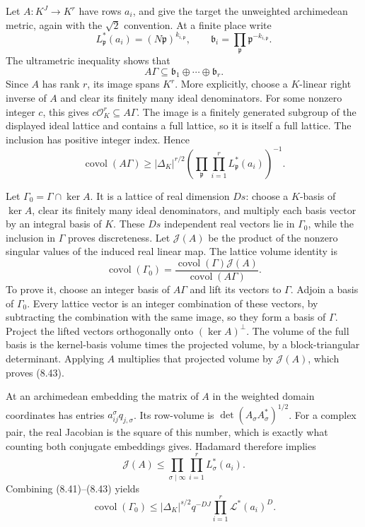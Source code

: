 \documentclass[
  11pt,
  a4paper,
]{article}
\begin{document}
Let \(A:K^J\to K^r\) have rows \(a_i\), and give the target the
unweighted archimedean metric, again with the \(\sqrt2\) convention. At
a finite place write \[
L_{\mathfrak p}^*(a_i)=(N\mathfrak p)^{k_{i,\mathfrak p}},
\qquad
\mathfrak b_i=\prod_{\mathfrak p}\mathfrak p^{-k_{i,\mathfrak p}}.
\] The ultrametric inequality shows that \[
A\Gamma\subseteq\mathfrak b_1\oplus\cdots\oplus\mathfrak b_r.
\] Since \(A\) has rank \(r\), its image spans \(K^r\). More explicitly,
choose a \(K\)-linear right inverse of \(A\) and clear its finitely many
ideal denominators. For some nonzero integer \(c\), this gives
\(c\mathcal O_K^r\subseteq A\Gamma\). The image is a finitely generated
subgroup of the displayed ideal lattice and contains a full lattice, so
it is itself a full lattice. The inclusion has positive integer index.
Hence \[
\operatorname{covol}(A\Gamma)\ge
|\Delta_K|^{r/2}
\left(\prod_{\mathfrak p}\prod_{i=1}^r
L_{\mathfrak p}^*(a_i)\right)^{-1}.
\tag{8.42}
\]

Let \(\Gamma_0=\Gamma\cap\ker A\). It is a lattice of real dimension
\(Ds\): choose a \(K\)-basis of \(\ker A\), clear its finitely many
ideal denominators, and multiply each basis vector by an integral basis
of \(K\). These \(Ds\) independent real vectors lie in \(\Gamma_0\),
while the inclusion in \(\Gamma\) proves discreteness. Let
\(\mathcal J(A)\) be the product of the nonzero singular values of the
induced real linear map. The lattice volume identity is \[
\operatorname{covol}(\Gamma_0)=
\frac{\operatorname{covol}(\Gamma)\mathcal J(A)}
{\operatorname{covol}(A\Gamma)}.
\tag{8.43}
\] To prove it, choose an integer basis of \(A\Gamma\) and lift its
vectors to \(\Gamma\). Adjoin a basis of \(\Gamma_0\). Every lattice
vector is an integer combination of these vectors, by subtracting the
combination with the same image, so they form a basis of \(\Gamma\).
Project the lifted vectors orthogonally onto \((\ker A)^\perp\). The
volume of the full basis is the kernel-basis volume times the projected
volume, by a block-triangular determinant. Applying \(A\) multiplies
that projected volume by \(\mathcal J(A)\), which proves (8.43).

At an archimedean embedding the matrix of \(A\) in the weighted domain
coordinates has entries \(a_{ij}^\sigma q_{j,\sigma}\). Its row-volume
is \(\det(A_\sigma A_\sigma^*)^{1/2}\). For a complex pair, the real
Jacobian is the square of this number, which is exactly what counting
both conjugate embeddings gives. Hadamard therefore implies \[
\mathcal J(A)\le
\prod_{\sigma\mid\infty}\prod_{i=1}^r L_\sigma^*(a_i).
\] Combining (8.41)--(8.43) yields \[
\operatorname{covol}(\Gamma_0)\le
|\Delta_K|^{s/2}q^{-DJ}
\prod_{i=1}^r\mathcal L^*(a_i)^D.
\tag{8.44}
\]
\end{document}
